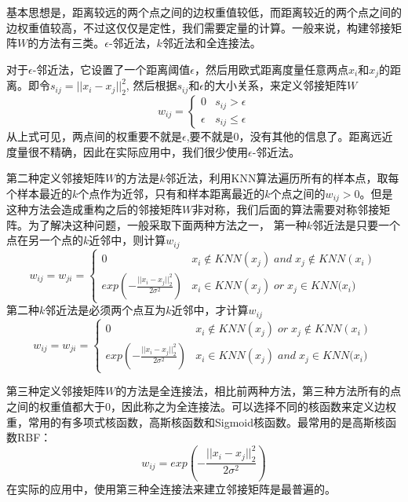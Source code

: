 基本思想是，距离较远的两个点之间的边权重值较低，而距离较近的两个点之间的边权重值较高，不过这仅仅是定性，我们需要定量的计算。一般来说，构建邻接矩阵$W$的方法有三类。$\epsilon$-邻近法，$k$邻近法和全连接法。

对于$\epsilon$-邻近法，它设置了一个距离阈值$\epsilon$，然后用欧式距离度量任意两点$x_i$和$x_j$的距离。即令$s_{ij} = ||x_i-x_j||_2^2$,  然后根据$s_{ij}$和$\epsilon$的大小关系，来定义邻接矩阵$W$
\begin{equation}
w_{ij}= \begin{cases} 0& {s_{ij} > \epsilon}\\ \epsilon& {{s_{ij} \leq \epsilon}} \end{cases}
\end{equation}
从上式可见，两点间的权重要不就是$\epsilon$,要不就是0，没有其他的信息了。距离远近度量很不精确，因此在实际应用中，我们很少使用$\epsilon$-邻近法。

第二种定义邻接矩阵$W$的方法是$k$邻近法，利用KNN算法遍历所有的样本点，取每个样本最近的$k$个点作为近邻，只有和样本距离最近的$k$个点之间的$w_{ij}>0$。但是这种方法会造成重构之后的邻接矩阵$W$非对称，我们后面的算法需要对称邻接矩阵。为了解决这种问题，一般采取下面两种方法之一，
第一种$k$邻近法是只要一个点在另一个点的$k$近邻中，则计算$w_{ij}$
\begin{equation}
w_{ij}=w_{ji}= \begin{cases} 0& {x_i \notin KNN(x_j) \;and \;x_j \notin KNN(x_i)}\\ exp(-\frac{||x_i-x_j||_2^2}{2\sigma^2})& {x_i \in KNN(x_j)\; or\; x_j \in KNN(x_i}) \end{cases}
\end{equation}
第二种$k$邻近法是必须两个点互为$k$近邻中，才计算$w_{ij}$
\begin{equation}
w_{ij}=w_{ji}= \begin{cases} 0& {x_i \notin KNN(x_j) \;or\;x_j \notin KNN(x_i)}\\ exp(-\frac{||x_i-x_j||_2^2}{2\sigma^2})& {x_i \in KNN(x_j)\; and \; x_j \in KNN(x_i}) \end{cases}
\end{equation}

第三种定义邻接矩阵$W$的方法是全连接法，相比前两种方法，第三种方法所有的点之间的权重值都大于0，因此称之为全连接法。可以选择不同的核函数来定义边权重，常用的有多项式核函数，高斯核函数和Sigmoid核函数。最常用的是高斯核函数RBF：
\begin{equation}
w_{ij}=exp(-\frac{||x_i-x_j||_2^2}{2\sigma^2})
\end{equation}
在实际的应用中，使用第三种全连接法来建立邻接矩阵是最普遍的。

